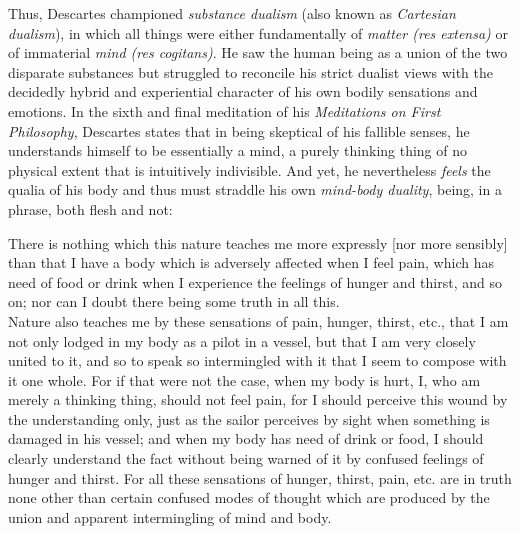 \begin{tcolorbox}[breakable, enhanced, colback=textbook-blue, sharp corners]
	Thus, Descartes championed \textit{substance dualism} (also known as \textit{Cartesian dualism}), in which all things were either fundamentally of \textit{matter (res extensa)} or of immaterial \textit{mind (res cogitans)}. He saw the human being as a union of the two disparate substances but struggled to reconcile his strict dualist views with the decidedly hybrid and experiential character of his own bodily sensations and emotions. In the sixth and final meditation of his \textit{Meditations on First Philosophy}, Descartes states that in being skeptical of his fallible senses, he understands himself to be essentially a mind, a purely thinking thing of no physical extent that is intuitively indivisible. And yet, he nevertheless \textit{feels} the qualia of his body and thus must straddle his own \textit{mind-body duality}, being, in a phrase, both flesh and not: \\
	
	\begin{displayquote}
		There is nothing which this nature teaches me more expressly [nor more sensibly] than that I have a body which is adversely affected when I feel pain, which has need of food or drink when I experience the feelings of hunger and thirst, and so on; nor can I doubt there being some truth in all this. \\
		
		Nature also teaches me by these sensations of pain, hunger, thirst, etc., that I am not only lodged in my body as a pilot in a vessel, but that I am very closely united to it, and so to speak so intermingled with it that I seem to compose with it one whole. For if that were not the case, when my body is hurt, I, who am merely a thinking thing, should not feel pain, for I should perceive this wound by the understanding only, just as the sailor perceives by sight when something is damaged in his vessel; and when my body has need of drink or food, I should clearly understand the fact without being warned of it by confused feelings of hunger and thirst. For all these sensations of hunger, thirst, pain, etc. are in truth none other than certain confused modes of thought which are produced by the union and apparent intermingling of mind and body. \\
	\end{displayquote}
	

\end{tcolorbox}
